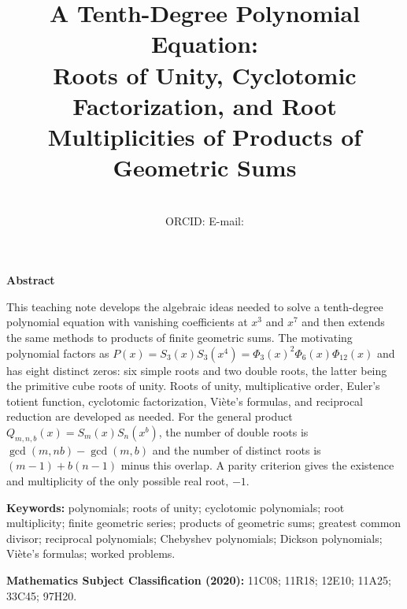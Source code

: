 \documentclass[11pt,a4paper]{article}
\title{A Tenth-Degree Polynomial Equation:\\
Roots of Unity, Cyclotomic Factorization, and Root Multiplicities of Products of Geometric Sums}
\author{\AuthorName\\[2pt]
\small ORCID: \href{https://orcid.org/\AuthorOrcid}{\AuthorOrcid}
\quad E-mail: \href{mailto:\AuthorEmail}{\AuthorEmail}\\[2pt]
\small \AuthorAffiliation}
\date{}
\makeatletter
\numberwithin{equation}{section}
\theoremstyle{uprightpaper}
\renewcommand{\maketitle}{%
  \thispagestyle{plain}%
  \begingroup
    \setlength{\parindent}{0pt}%
    \setlength{\parskip}{0pt}%
    \centering
    {\LARGE \@title\par}%
    \vspace{6pt}%
    {\normalsize \@author\par}%
  \endgroup
  \vspace{6pt}%
}
\renewenvironment{abstract}{%
  \par\begingroup\small
  \setlength{\parskip}{0pt}%
  \begin{center}\bfseries Abstract\end{center}%
  \vspace{-4pt}\noindent\ignorespaces
}{\par\endgroup\vspace{5pt}}
\makeatother
\begin{document}
\maketitle
\begin{abstract}
This teaching note develops the algebraic ideas needed to solve a tenth-degree polynomial equation with vanishing coefficients at $x^3$ and $x^7$ and then extends the same methods to products of finite geometric sums. The motivating polynomial factors as $P(x)=S_3(x)S_3(x^4)=\Phi_3(x)^2\Phi_6(x)\Phi_{12}(x)$ and has eight distinct zeros: six simple roots and two double roots, the latter being the primitive cube roots of unity. Roots of unity, multiplicative order, Euler's totient function, cyclotomic factorization, Vi\`ete's formulas, and reciprocal reduction are developed as needed. For the general product $Q_{m,n,b}(x)=S_m(x)S_n(x^b)$, the number of double roots is $\gcd(m,nb)-\gcd(m,b)$ and the number of distinct roots is $(m-1)+b(n-1)$ minus this overlap. A parity criterion gives the existence and multiplicity of the only possible real root, $-1$.
\end{abstract}
\begingroup\small
\noindent\textbf{Keywords:} polynomials; roots of unity; cyclotomic polynomials; root multiplicity; finite geometric series; products of geometric sums; greatest common divisor; reciprocal polynomials; Chebyshev polynomials; Dickson polynomials; Vi\`ete's formulas; worked problems.\par
\noindent\textbf{Mathematics Subject Classification (2020):} 11C08; 11R18; 12E10; 11A25; 33C45; 97H20.

\par\endgroup
\end{document}
